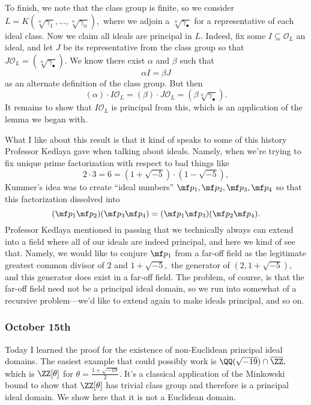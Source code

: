 To finish, we note that the class group is finite, so we consider $L=K(\sqrt[n]{\gamma_1},\ldots,\sqrt[n]{\gamma_n}),$ where we adjoin a $\sqrt[n]{\gamma_\bullet}$ for a representative of each ideal class. Now we claim all ideals are principal in $L.$ Indeed, fix some $I\subseteq\mathcal O_L$ an ideal, and let $J$ be its representative from the class group so that $J\mathcal O_L=(\sqrt[n]{\gamma_\bullet}).$ We know there exist $\alpha$ and $\beta$ such that
\[\alpha I=\beta J\]
as an alternate definition of the class group. But then
\[(\alpha)\cdot I\mathcal O_L=(\beta)\cdot J\mathcal O_L=(\beta\sqrt[n]{\gamma_\bullet}).\]
It remains to show that $I\mathcal O_L$ is principal from this, which is an application of the lemma we began with.

What I like about this result is that it kind of speaks to some of this history Professor Kedlaya gave when talking about ideals. Namely, when we're trying to fix unique prime factorization with respect to bad things like
\[2\cdot3=6=(1+\sqrt{-5})\cdot(1-\sqrt{-5}),\]
Kummer's idea was to create ``ideal numbers'' $\mf p_1,\mf p_2,\mf p_3,\mf p_4$ so that this factorization dissolved into
\[(\mf p_1\mf p_2)(\mf p_3\mf p_4)=(\mf p_1\mf p_3)(\mf p_2\mf p_4).\]
Professor Kedlaya mentioned in passing that we technically always can extend into a field where all of our ideals are indeed principal, and here we kind of see that. Namely, we would like to conjure $\mf p_1$ from a far-off field as the legitimate greatest common divisor of $2$ and $1+\sqrt{-5},$ the generator of $(2,1+\sqrt{-5}),$ and this generator does exist in a far-off field. The problem, of course, is that the far-off field need not be a principal ideal domain, so we run into somewhat of a recursive problem---we'd like to extend again to make ideals principal, and so on.

\subsubsection{October 15th}
Today I learned the proof for the existence of non-Euclidean principal ideal domains. The easiest example that could possibly work is $\QQ(\sqrt{-19})\cap\overline\ZZ,$ which is $\ZZ[\theta]$ for $\theta=\frac{1+\sqrt{-19}}2.$ It's a classical application of the Minkowski bound to show that $\ZZ[\theta]$ has trivial class group and therefore is a principal ideal domain. We show here that it is not a Euclidean domain.

